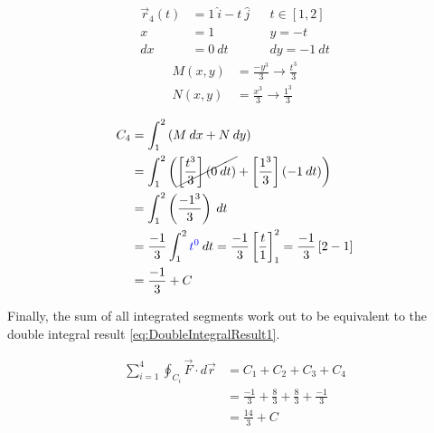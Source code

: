 \documentclass{article}
\begin{document}
\begin{center}
\noindent\begin{minipage}{0.4\linewidth}
    \begin{equation*}
    \begin{aligned}
    \vec{r}_4(t) &= 1\:\hat{i} - t\:\hat{j} && t \in \left[1, 2\right] \\
    x &= 1 && y = -t \\
    dx &= 0\:dt && dy = -1\:dt
    \end{aligned}
    \end{equation*}
    \begin{equation*}
    \begin{aligned}
        M(x,y) &= \frac{-y^3}{3} \to \frac{t^3}{3} \\
        N(x,y) &= \frac{x^3}{3} \to \frac{1^3}{3}
    \end{aligned}
    \end{equation*}
\end{minipage}
\begin{minipage}{0.4\linewidth}
    \begin{equation*}
    \begin{aligned}
        C_4 &= \int_1^2{\left(M\:dx + N\:dy\right)} \\
        &= \int_1^2{\left( \cancel{\left[\frac{t^3}{3}\right]\left(0\:dt\right)} + \left[\frac{1^3}{3}\right]\left(-1\:dt\right) \right)} \\
        &= \int_1^2{ \left(\frac{-1^3}{3}\right)\:dt} \\
        &= \frac{-1}{3}\int_1^2{ \textcolor{blue}{t^0}\:dt} = \frac{-1}{3}\left[\frac{t}{1}\right]_1^2 = \frac{-1}{3}\left[2 - 1\right] \\
        &= \frac{-1}{3} + C
    \end{aligned}
    \end{equation*}
\end{minipage}
\end{center}

Finally, the sum of all integrated segments work out to be equivalent to the double integral result \eqref{eq:DoubleIntegralResult1}.

\begin{equation}
    \begin{aligned}
        \sum_{i=1}^4{\oint_{C_i}{\vec{F}\cdot d\vec{r}}} &= C_1 + C_2 + C_3 + C_4 \\
        &= \frac{-1}{3} + \frac{8}{3} + \frac{8}{3} + \frac{-1}{3} \\
        &= \frac{14}{3} + C
    \end{aligned}
\end{equation}
\end{document}
